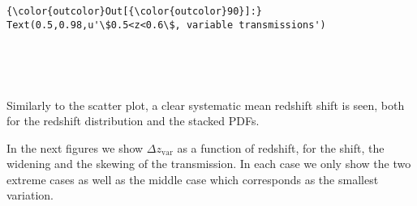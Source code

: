 \documentclass[11pt]{article}
\begin{document}
\begin{Verbatim}[commandchars=\\\{\}]
{\color{outcolor}Out[{\color{outcolor}90}]:} Text(0.5,0.98,u'\$0.5<z<0.6\$, variable transmissions')
\end{Verbatim}
            
    \begin{center}
    \end{center}
    { \hspace*{\fill} \\}
    
    \begin{center}
    \end{center}
    { \hspace*{\fill} \\}
    
    Similarly to the scatter plot, a clear systematic mean redshift shift is
seen, both for the redshift distribution and the stacked PDFs.

In the next figures we show \(\Delta z_\mathrm{var}\) as a function of
redshift, for the shift, the widening and the skewing of the
transmission. In each case we only show the two extreme cases as well as
the middle case which corresponds as the smallest variation.
\end{document}
